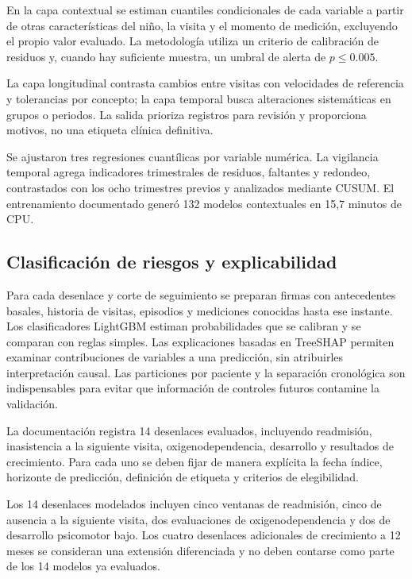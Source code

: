 \documentclass[conference,letterpaper]{IEEEtran}
\begin{document}
En la capa contextual se estiman cuantiles condicionales de cada variable a partir de otras características del niño, la visita y el momento de medición, excluyendo el propio valor evaluado. La metodología utiliza un criterio de calibración de residuos y, cuando hay suficiente muestra, un umbral de alerta de $p\leq0.005$.

La capa longitudinal contrasta cambios entre visitas con velocidades de referencia y tolerancias por concepto; la capa temporal busca alteraciones sistemáticas en grupos o periodos. La salida prioriza registros para revisión y proporciona motivos, no una etiqueta clínica definitiva.

Se ajustaron tres regresiones cuantílicas por variable numérica. La vigilancia temporal agrega indicadores trimestrales de residuos, faltantes y redondeo, contrastados con los ocho trimestres previos y analizados mediante CUSUM. El entrenamiento documentado generó 132 modelos contextuales en 15,7 minutos de CPU.

\subsection{Clasificación de riesgos y explicabilidad}

Para cada desenlace y corte de seguimiento se preparan firmas con antecedentes basales, historia de visitas, episodios y mediciones conocidas hasta ese instante. Los clasificadores LightGBM estiman probabilidades que se calibran y se comparan con reglas simples. Las explicaciones basadas en TreeSHAP permiten examinar contribuciones de variables a una predicción, sin atribuirles interpretación causal. Las particiones por paciente y la separación cronológica son indispensables para evitar que información de controles futuros contamine la validación.

La documentación registra 14 desenlaces evaluados, incluyendo readmisión, inasistencia a la siguiente visita, oxigenodependencia, desarrollo y resultados de crecimiento. Para cada uno se deben fijar de manera explícita la fecha índice, horizonte de predicción, definición de etiqueta y criterios de elegibilidad.

Los 14 desenlaces modelados incluyen cinco ventanas de readmisión, cinco de ausencia a la siguiente visita, dos evaluaciones de oxigenodependencia y dos de desarrollo psicomotor bajo. Los cuatro desenlaces adicionales de crecimiento a 12 meses se consideran una extensión diferenciada y no deben contarse como parte de los 14 modelos ya evaluados.
\end{document}
